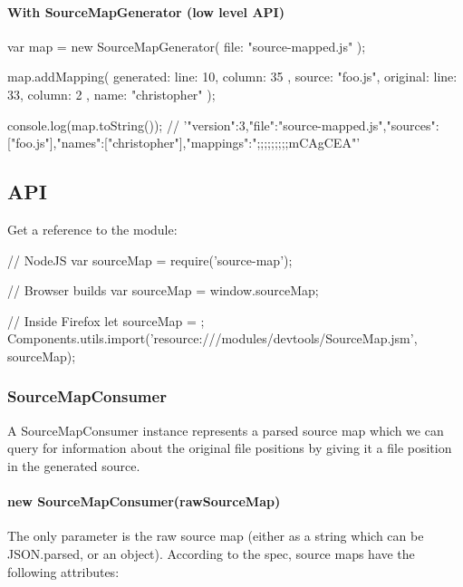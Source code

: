 \paragraph*{With Source\+Map\+Generator (low level A\+P\+I)}

\begin{DoxyVerb}var map = new SourceMapGenerator({
  file: "source-mapped.js"
});

map.addMapping({
  generated: {
    line: 10,
    column: 35
  },
  source: "foo.js",
  original: {
    line: 33,
    column: 2
  },
  name: "christopher"
});

console.log(map.toString());
// '{"version":3,"file":"source-mapped.js","sources":["foo.js"],"names":["christopher"],"mappings":";;;;;;;;;mCAgCEA"}'
\end{DoxyVerb}


\subsection*{A\+P\+I}

Get a reference to the module\+: \begin{DoxyVerb}// NodeJS
var sourceMap = require('source-map');

// Browser builds
var sourceMap = window.sourceMap;

// Inside Firefox
let sourceMap = {};
Components.utils.import('resource:///modules/devtools/SourceMap.jsm', sourceMap);
\end{DoxyVerb}


\subsubsection*{Source\+Map\+Consumer}

A Source\+Map\+Consumer instance represents a parsed source map which we can query for information about the original file positions by giving it a file position in the generated source.

\paragraph*{new Source\+Map\+Consumer(raw\+Source\+Map)}

The only parameter is the raw source map (either as a string which can be {\ttfamily J\+S\+O\+N.\+parse}\textquotesingle{}d, or an object). According to the spec, source maps have the following attributes\+:


